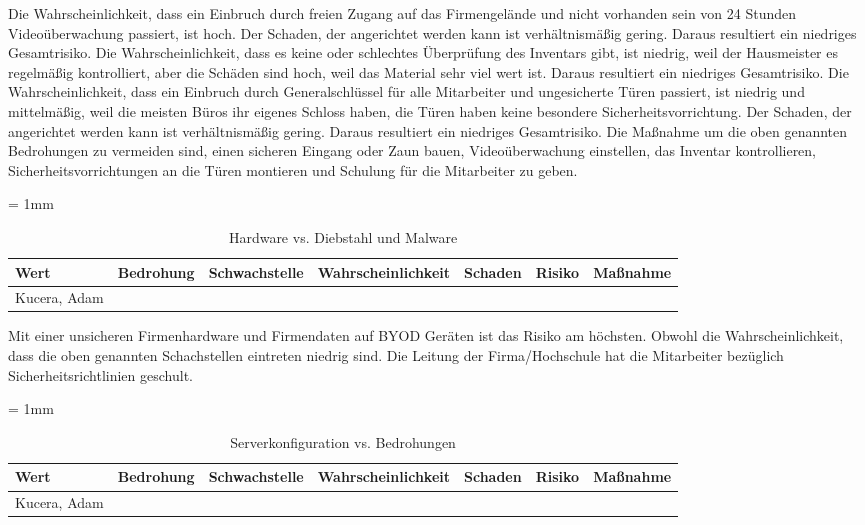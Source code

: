 Die Wahrscheinlichkeit, dass ein Einbruch durch freien Zugang auf das Firmengelände und  nicht vorhanden sein von 24 Stunden Videoüberwachung passiert, ist hoch. Der Schaden, der angerichtet werden kann ist verhältnismäßig gering. Daraus resultiert ein niedriges Gesamtrisiko.
Die Wahrscheinlichkeit, dass es keine oder schlechtes Überprüfung des Inventars gibt, ist niedrig, weil der Hausmeister es regelmäßig kontrolliert, aber die Schäden sind hoch, weil das Material sehr viel wert ist. Daraus resultiert ein niedriges Gesamtrisiko.
Die Wahrscheinlichkeit, dass ein Einbruch durch Generalschlüssel für alle Mitarbeiter und  ungesicherte Türen passiert, ist niedrig und mittelmäßig, weil die meisten Büros ihr eigenes Schloss haben, die Türen haben keine besondere Sicherheitsvorrichtung. Der Schaden, der angerichtet werden kann ist verhältnismäßig gering. Daraus resultiert ein niedriges Gesamtrisiko.
Die Maßnahme um die oben genannten Bedrohungen zu vermeiden sind, einen sicheren Eingang oder Zaun bauen, Videoüberwachung einstellen, das Inventar kontrollieren, Sicherheitsvorrichtungen an die Türen montieren und Schulung für die Mitarbeiter zu geben.

\begin{table}[H]
	\sffamily
	\caption{Hardware vs. Diebstahl und Malware}
	\tabulinesep = 1mm %
	\centering
		\begin{tabu} to 0.9\textwidth {| X[1]  X[1] | X[1] | X[1] | X[1] | X[1] | X[1] |}
		\hline
		\textbf{Wert} & \textbf{Bedrohung} & \textbf{Schwachstelle} & \textbf{Wahrscheinlichkeit} & \textbf{Schaden} & \textbf{Risiko} & \textbf{Maßnahme}\\
		\hline 
		Kucera, Adam &  & & & & &\\
		\hline
	\end{tabu}
\end{table}

Mit einer unsicheren Firmenhardware und Firmendaten auf BYOD Geräten ist das Risiko am höchsten. Obwohl die Wahrscheinlichkeit, dass die oben genannten Schachstellen eintreten niedrig sind. Die Leitung der Firma/Hochschule hat die Mitarbeiter bezüglich Sicherheitsrichtlinien geschult.

\begin{table}[H]
	\sffamily
	\caption{Serverkonfiguration vs. Bedrohungen}
	\tabulinesep = 1mm %
	\centering
		\begin{tabu} to 0.9\textwidth {| X[1] | X[1] | X[1] | X[1] | X[1] | X[1] | X[1] |}
		\hline
		\textbf{Wert} & \textbf{Bedrohung} & \textbf{Schwachstelle} & \textbf{Wahrscheinlichkeit} & \textbf{Schaden} & \textbf{Risiko} & \textbf{Maßnahme}\\
		\hline 
		Kucera, Adam &  & & & & &\\
		\hline
	\end{tabu}
\end{table}

